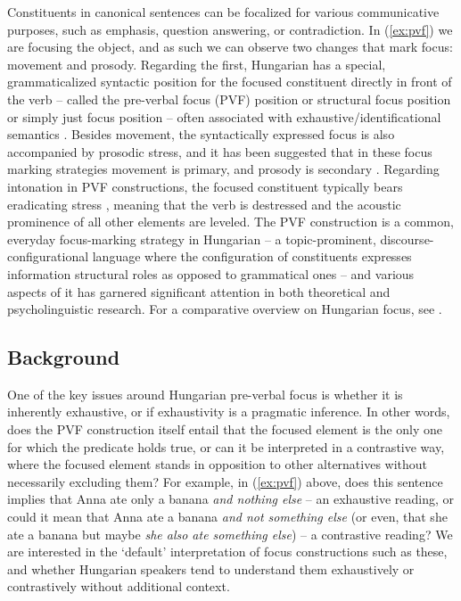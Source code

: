 \documentclass[ruler]{CUP-JNL-LIN}%
\begin{document}
Constituents in canonical sentences can be focalized for various communicative purposes, such as emphasis, question answering, or contradiction. In (\ref{ex:pvf}) we are focusing the object, and as such we can observe two changes that mark focus: movement and prosody. Regarding the first, Hungarian has a special, grammaticalized syntactic position for the focused constituent directly in front of the verb -- called the pre-verbal focus (PVF) position \citep{wedgwood_2006_predication,balogh_2007_focus} or structural focus position \citep{ekiss_1998_multiple} or simply just focus position -- often associated with exhaustive/identificational semantics \citep{balogh_2013_hungarian}. Besides movement, the syntactically expressed focus is also accompanied by prosodic stress, and it has been suggested that in these focus marking strategies movement is primary, and prosody is secondary \citep{balogh_2013_hungarian}. Regarding intonation in PVF constructions, the focused constituent typically bears eradicating stress \citep[cf.][]{kornai_1988_hungarian,gecseg_2020_focused}, meaning that the verb is destressed and the acoustic prominence of all other elements are leveled. The PVF construction is a common, everyday focus-marking strategy in Hungarian -- a topic-prominent, discourse-configurational language where the configuration of constituents expresses information structural roles as opposed to grammatical ones \citep[cf.][]{ekiss_1995_discourse} -- and various aspects of it has garnered significant attention in both theoretical and psycholinguistic research. For a comparative overview on Hungarian focus, see \citep{bendefarkas_2006_comparing}.



\subsection{Background}

One of the key issues around Hungarian pre-verbal focus is whether it is inherently exhaustive, or if exhaustivity is a pragmatic inference. In other words, does the PVF construction itself entail that the focused element is the only one for which the predicate holds true, or can it be interpreted in a contrastive way, where the focused element stands in opposition to other alternatives without necessarily excluding them? For example, in (\ref{ex:pvf}) above, does this sentence implies that Anna ate only a banana \textit{and nothing else} -- an exhaustive reading, or could it mean that Anna ate a banana \textit{and not something else} (or even, that she ate a banana but maybe \textit{she also ate something else}) -- a contrastive reading? We are interested in the `default' interpretation of focus constructions such as these, and whether Hungarian speakers tend to understand them exhaustively or contrastively without additional context.
\end{document}
